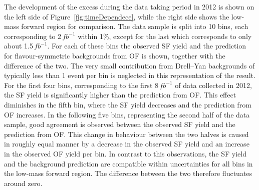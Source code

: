 The development of the excess during the data taking period in 2012 is shown on the left side of Figure~\ref{fig:timeDependece}, while the right side shows the low-mass forward region for comparison. The data sample is split into 10 bins, each corresponding to 2\,$fb^{-1}$ within 1\%, except for the last which corresponds to only  about 1.5\,$fb^{-1}$. For each of these bins the observed SF yield and the prediction for flavour-symmetric backgrounds from OF is shown, together with the difference of the two. The very small contribution from Drell--Yan backgrounds of typically less than 1 event per bin is neglected in this representation of the result. For the first four bins, corresponding to the first 8\,$fb^{-1}$ of data collected in 2012, the SF yield is significantly higher than the prediction from OF. This effect diminishes in the fifth bin, where the SF yield decreases and the prediction from OF increases. In the following five bins, representing the second half of the data sample, good agreement is observed between the observed SF yield and the prediction from OF. This change in behaviour between the two halves is caused in roughly equal manner by a decrease in the observed SF yield and an increase in the observed OF yield per bin. In contrast to this observations, the SF yield and the background prediction are compatible within uncertainties for all bins in the low-mass forward region. The difference between the two therefore fluctuates around zero.

